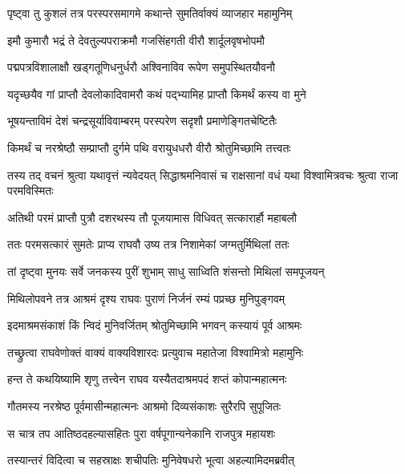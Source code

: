 
\twolineshloka
{पृष्ट्वा तु कुशलं तत्र परस्परसमागमे}
{कथान्ते सुमतिर्वाक्यं व्याजहार महामुनिम्} %

\twolineshloka
{इमौ कुमारौ भद्रं ते देवतुल्यपराक्रमौ}
{गजसिंहगती वीरौ शार्दूलवृषभोपमौ} %

\twolineshloka
{पद्मपत्रविशालाक्षौ खड्गतूणिधनुर्धरौ}
{अश्विनाविव रूपेण समुपस्थितयौवनौ} %

\twolineshloka
{यदृच्छयैव गां प्राप्तौ देवलोकादिवामरौ}
{कथं पद्भ्यामिह प्राप्तौ किमर्थं कस्य वा मुने} %

\twolineshloka
{भूषयन्ताविमं देशं चन्द्रसूर्याविवाम्बरम्}
{परस्परेण सदृशौ प्रमाणेङ्गितचेष्टितैः} %

\twolineshloka
{किमर्थं च नरश्रेष्ठौ सम्प्राप्तौ दुर्गमे पथि}
{वरायुधधरौ वीरौ श्रोतुमिच्छामि तत्त्वतः} %

\threelineshloka
{तस्य तद् वचनं श्रुत्वा यथावृत्तं न्यवेदयत्}
{सिद्धाश्रमनिवासं च राक्षसानां वधं यथा}
{विश्वामित्रवचः श्रुत्वा राजा परमविस्मितः} %

\twolineshloka
{अतिथी परमं प्राप्तौ पुत्रौ दशरथस्य तौ}
{पूजयामास विधिवत् सत्कारार्हौ महाबलौ} %

\twolineshloka
{ततः परमसत्कारं सुमतेः प्राप्य राघवौ}
{उष्य तत्र निशामेकां जग्मतुर्मिथिलां ततः} %

\twolineshloka
{तां दृष्ट्वा मुनयः सर्वे जनकस्य पुरीं शुभाम्}
{साधु साध्विति शंसन्तो मिथिलां समपूजयन्} %

\twolineshloka
{मिथिलोपवने तत्र आश्रमं दृश्य राघवः}
{पुराणं निर्जनं रम्यं पप्रच्छ मुनिपुङ्गवम्} %

\twolineshloka
{इदमाश्रमसंकाशं किं न्विदं मुनिवर्जितम्}
{श्रोतुमिच्छामि भगवन् कस्यायं पूर्व आश्रमः} %

\twolineshloka
{तच्छ्रुत्वा राघवेणोक्तं वाक्यं वाक्यविशारदः}
{प्रत्युवाच महातेजा विश्वामित्रो महामुनिः} %

\twolineshloka
{हन्त ते कथयिष्यामि शृणु तत्त्वेन राघव}
{यस्यैतदाश्रमपदं शप्तं कोपान्महात्मनः} %

\twolineshloka
{गौतमस्य नरश्रेष्ठ पूर्वमासीन्महात्मनः}
{आश्रमो दिव्यसंकाशः सुरैरपि सुपूजितः} %

\twolineshloka
{स चात्र तप आतिष्ठदहल्यासहितः पुरा}
{वर्षपूगान्यनेकानि राजपुत्र महायशः} %

\twolineshloka
{तस्यान्तरं विदित्वा च सहस्राक्षः शचीपतिः}
{मुनिवेषधरो भूत्वा अहल्यामिदमब्रवीत्} %

